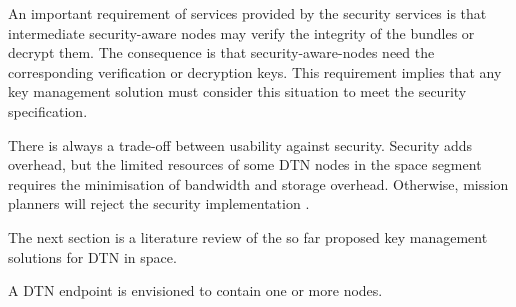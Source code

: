 An important requirement of services provided by the security services is that intermediate security-aware nodes may verify the integrity of the bundles or decrypt them. The consequence is that security-aware-nodes need the corresponding verification or decryption keys. This requirement implies that any key management solution must consider this situation to meet the security specification. 

There is always a trade-off between usability against security. Security adds overhead, but the limited resources of some DTN nodes in the space segment requires the minimisation of bandwidth and storage overhead. Otherwise, mission planners will reject the security implementation \cite{book2012architecture}.


The next section is a literature review of the so far proposed key management solutions for DTN in space.


A DTN endpoint is envisioned to contain one or more nodes.








